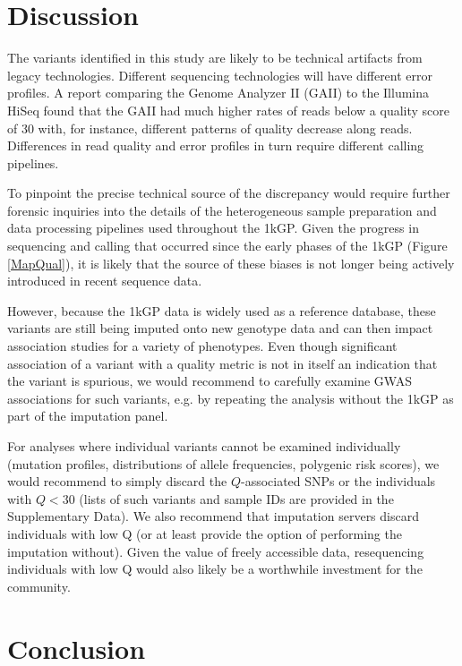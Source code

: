 \documentclass[9pt,lineno]{template}
\begin{document}
\section{Discussion}

The variants identified in this study are likely to be technical artifacts from legacy technologies.
Different sequencing technologies will have different error profiles. 
A report comparing the Genome Analyzer II (GAII) to the Illumina HiSeq found that the GAII had much higher rates of reads below a quality score of 30 \citep{Minoche2011} with, for instance, different patterns of quality decrease along reads. 
Differences in read quality and error profiles in turn require different calling pipelines.
 
To pinpoint the precise technical source of the discrepancy would require further forensic inquiries into the details of the heterogeneous sample preparation and data processing pipelines used throughout the 1kGP. Given the progress in sequencing and calling that occurred since the early phases of the 1kGP (Figure \ref{MapQual}), it is likely that the source of these biases is not longer being actively introduced in recent sequence data.

However, because the 1kGP data is widely used as a reference database, these variants are still being imputed onto new genotype data and can then impact association studies for a variety of phenotypes. Even though significant association of a variant with a quality metric is not in itself an indication that the variant is spurious, we would recommend to carefully examine GWAS associations for such variants, e.g. by repeating the analysis without the 1kGP as part of the imputation panel. 

For analyses where individual variants cannot be examined individually (mutation profiles, distributions of allele frequencies, polygenic risk scores), we would recommend to simply discard the $Q$-associated SNPs or the individuals with $Q<30$ (lists of such variants and sample IDs are provided in the Supplementary Data). We also recommend that imputation servers discard individuals with low Q (or at least provide the option of performing the imputation without). Given the value of freely accessible data, resequencing individuals with low Q would  also likely be a worthwhile investment for the community. 

\section{Conclusion}
\end{document}
